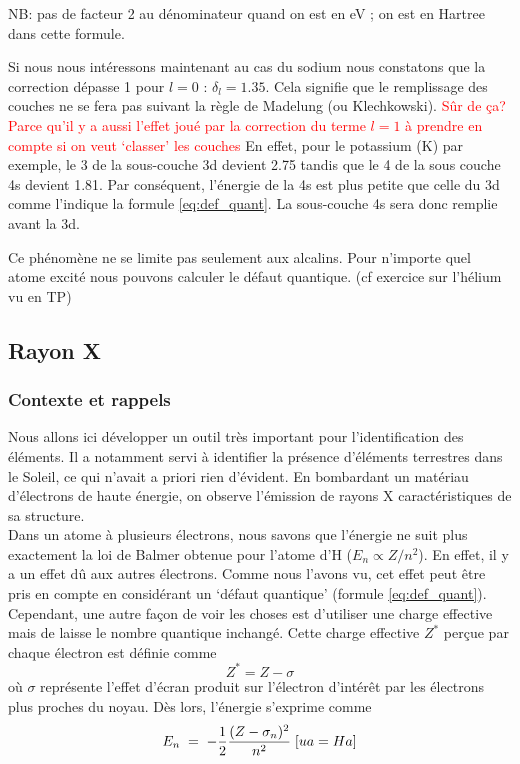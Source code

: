 NB: pas de facteur 2 au dénominateur quand on est en eV ; on est en Hartree dans cette formule. 
 


 
Si nous nous intéressons maintenant au cas du sodium nous constatons que la correction dépasse 1 pour $l=0$ : $\delta_l = 1.35$. Cela signifie que le remplissage des couches ne se fera pas suivant la règle de Madelung (ou  Klechkowski). \textcolor{red}{Sûr de ça? Parce qu'il y a aussi l'effet joué par la correction du terme $l=1$ à prendre en compte si on veut `classer' les couches}
En effet, pour le potassium (K) par exemple, le 3 de la sous-couche 3d devient 2.75 tandis que le 4 de la sous couche 4s devient 1.81. Par conséquent, l’énergie de la 4s est plus petite que celle du 3d comme l'indique la formule \ref{eq:def_quant}. La sous-couche 4s sera donc remplie avant la 3d.
 
Ce phénomène ne se limite pas seulement aux alcalins. Pour  n'importe quel atome excité nous pouvons calculer le défaut quantique. (cf exercice sur l'hélium vu en TP)




\subsection{Rayon X}
\subsubsection{Contexte et rappels}


Nous allons ici développer un outil très important pour l'identification des éléments. Il a notamment servi à identifier la présence d'éléments terrestres dans le Soleil, ce qui n'avait a priori rien d'évident. En bombardant un matériau d'électrons de haute énergie, on observe l'émission de rayons X caractéristiques de sa structure.\\

Dans un atome à plusieurs électrons, nous savons que l'énergie ne suit plus exactement la loi de Balmer obtenue pour l'atome d'H ($E_n \propto Z/n^2$). En effet, il y a un effet dû aux autres électrons. Comme nous l'avons vu, cet effet peut être pris en compte en considérant un `défaut quantique' (formule \ref{eq:def_quant}). Cependant, une autre façon de voir les choses est d'utiliser une charge effective mais de laisse le nombre quantique inchangé. Cette charge effective $Z^{*}$ perçue par chaque électron est définie comme \[ Z^{*}=Z-\sigma \] où $\sigma$ représente l'effet d'écran produit sur l'électron d'intérêt par les électrons plus proches du noyau. Dès lors, l'énergie s'exprime comme
\begin{equation}
    E_n \; = \; -\dfrac{1}{2} \dfrac{(Z-\sigma_n)^2}{n^2} \; [ua = Ha]
    \label{eq:energie_effective}
\end{equation}


